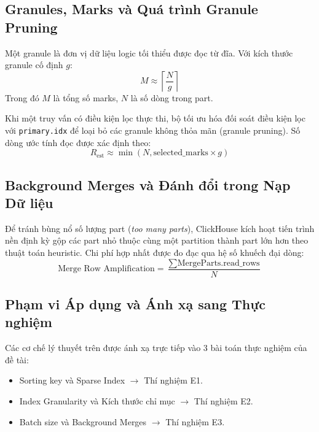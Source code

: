 \subsection{Granules, Marks và Quá trình Granule Pruning}
Một granule là đơn vị dữ liệu logic tối thiểu được đọc từ đĩa. Với kích thước granule cố định $g$:
\begin{equation}
    M \approx \left\lceil \frac{N}{g} \right\rceil
\end{equation}
Trong đó $M$ là tổng số marks, $N$ là số dòng trong part.

Khi một truy vấn có điều kiện lọc thực thi, bộ tối ưu hóa đối soát điều kiện lọc với \texttt{primary.idx} để loại bỏ các granule không thỏa mãn (granule pruning). Số dòng ước tính đọc được xác định theo:
\begin{equation}
    R_{\text{est}} \approx \min(N, \text{selected\_marks} \times g)
\end{equation}

\subsection{Background Merges và Đánh đổi trong Nạp Dữ liệu}
Để tránh bùng nổ số lượng part (\textit{too many parts}), ClickHouse kích hoạt tiến trình nền định kỳ gộp các part nhỏ thuộc cùng một partition thành part lớn hơn theo thuật toán heuristic. Chi phí hợp nhất được đo đạc qua hệ số khuếch đại dòng:
\begin{equation}
    \text{Merge Row Amplification} = \frac{\sum \text{MergeParts.read\_rows}}{N}
\end{equation}

\subsection{Phạm vi Áp dụng và Ánh xạ sang Thực nghiệm}
Các cơ chế lý thuyết trên được ánh xạ trực tiếp vào 3 bài toán thực nghiệm của đề tài:
\begin{itemize}
    \item Sorting key và Sparse Index $\rightarrow$ Thí nghiệm E1.
    \item Index Granularity và Kích thước chỉ mục $\rightarrow$ Thí nghiệm E2.
    \item Batch size và Background Merges $\rightarrow$ Thí nghiệm E3.
\end{itemize}
